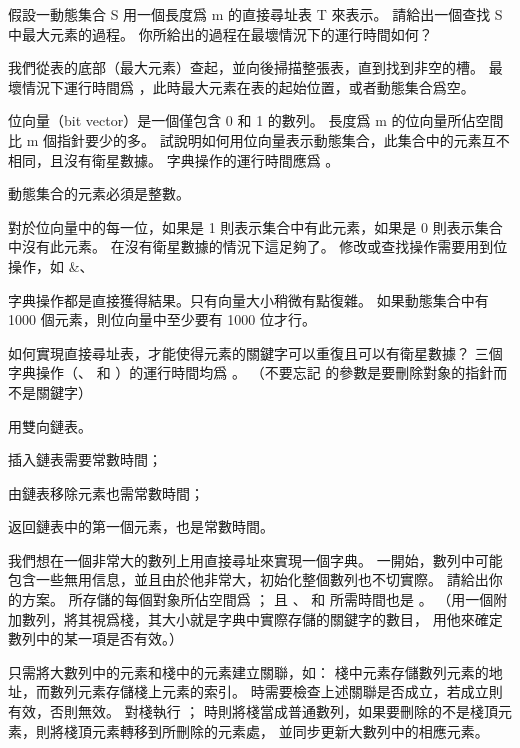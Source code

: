\startsection[
  title={Direct-address tables},
]

\startEXERCISE
假設一動態集合 S 用一個長度爲 m 的直接尋址表 T 來表示。
請給出一個查找 S 中最大元素的過程。
你所給出的過程在最壞情況下的運行時間如何？
\stopEXERCISE

\startANSWER
我們從表的底部（最大元素）查起，並向後掃描整張表，直到找到非空的槽。
最壞情況下運行時間爲 ，此時最大元素在表的起始位置，或者動態集合爲空。
\stopANSWER

\startEXERCISE
{\EMP 位向量}（{\EMP bit vector}）是一個僅包含 0 和 1 的數列。
長度爲 m 的位向量所佔空間比 m 個指針要少的多。
試說明如何用位向量表示動態集合，此集合中的元素互不相同，且沒有衛星數據。
字典操作的運行時間應爲 。
\stopEXERCISE

\startANSWER
動態集合的元素必須是整數。

對於位向量中的每一位，如果是 1 則表示集合中有此元素，如果是 0 則表示集合中沒有此元素。
在沒有衛星數據的情況下這足夠了。
修改或查找操作需要用到位操作，如 \&、 \|。

字典操作都是直接獲得結果。只有向量大小稍微有點復雜。
如果動態集合中有 1000 個元素，則位向量中至少要有 1000 位才行。
\stopANSWER

\startEXERCISE
如何實現直接尋址表，才能使得元素的關鍵字可以重復且可以有衛星數據？
三個字典操作（、  和 ）的運行時間均爲 。
（不要忘記  的參數是要刪除對象的指針而不是關鍵字）
\stopEXERCISE

\startANSWER
用雙向鏈表。

\startigBase[a]
\item {} 插入鏈表需要常數時間；
\item {} 由鏈表移除元素也需常數時間；
\item {} 返回鏈表中的第一個元素，也是常數時間。
\stopigBase
\stopANSWER

\startEXERCISE\DIFFICULT
我們想在一個{\EMP 非常大}的數列上用直接尋址來實現一個字典。
一開始，數列中可能包含一些無用信息，並且由於他非常大，初始化整個數列也不切實際。
請給出你的方案。
所存儲的每個對象所佔空間爲 ；
且 、  和  所需時間也是 。
（\hint 用一個附加數列，將其視爲棧，其大小就是字典中實際存儲的關鍵字的數目，
用他來確定數列中的某一項是否有效。）
\stopEXERCISE

\startANSWER
只需將大數列中的元素和棧中的元素建立關聯，如：
棧中元素存儲數列元素的地址，而數列元素存儲棧上元素的索引。
  時需要檢查上述關聯是否成立，若成立則有效，否則無效。
  對棧執行 ；
  時則將棧當成普通數列，如果要刪除的不是棧頂元素，則將棧頂元素轉移到所刪除的元素處，
並同步更新大數列中的相應元素。
\stopANSWER

\stopsection
